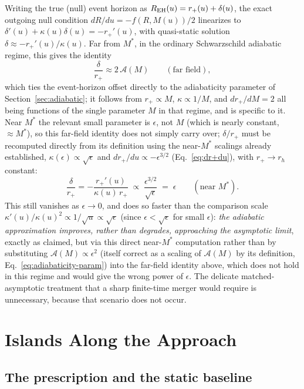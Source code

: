 \documentclass[11pt]{article}
\begin{document}
Writing the true (null) event horizon as $R_{\rm EH}(u)=r_+(u)+\delta(u)$, the exact outgoing null condition $dR/du=-f(R,M(u))/2$ linearizes to $\delta'(u)+\kappa(u)\delta(u)=-r_+'(u)$, with quasi-static solution $\delta\approx-r_+'(u)/\kappa(u)$. Far from $M^*$, in the ordinary Schwarzschild adiabatic regime, this gives the identity
\begin{equation}
\frac{\delta}{r_+}\approx2\,\mathcal{A}(M)\qquad(\text{far field}),
\label{eq:far-field-identity}
\end{equation}
which ties the event-horizon offset directly to the adiabaticity parameter of Section~\ref{sec:adiabatic}; it follows from $r_+\propto M$, $\kappa\propto1/M$, and $dr_+/dM=2$ all being functions of the single parameter $M$ in that regime, and is specific to it. Near $M^*$ the relevant small parameter is $\epsilon$, not $M$ (which is nearly constant, $\approx M^*$), so this far-field identity does not simply carry over; $\delta/r_+$ must be recomputed directly from its definition using the near-$M^*$ scalings already established, $\kappa(\epsilon)\propto\sqrt\epsilon$ and $dr_+/du\propto-\epsilon^{3/2}$ (Eq.~\eqref{eq:dr+du}), with $r_+\to r_h$ constant:
\begin{equation}
\frac{\delta}{r_+}=-\frac{r_+'(u)}{\kappa(u)\,r_+}\;\propto\;\frac{\epsilon^{3/2}}{\sqrt\epsilon}\;=\;\epsilon\qquad(\text{near }M^*).
\end{equation}
This still vanishes as $\epsilon\to0$, and does so faster than the comparison scale $\kappa'(u)/\kappa(u)^2\propto1/\sqrt u\propto\sqrt\epsilon$ (since $\epsilon<\sqrt\epsilon$ for small $\epsilon$): \emph{the adiabatic approximation improves, rather than degrades, approaching the asymptotic limit}, exactly as claimed, but via this direct near-$M^*$ computation rather than by substituting $\mathcal{A}(M)\propto\epsilon^2$ (itself correct as a scaling of $\mathcal{A}(M)$ by its definition, Eq.~\eqref{eq:adiabaticity-param}) into the far-field identity above, which does not hold in this regime and would give the wrong power of $\epsilon$. The delicate matched-asymptotic treatment that a sharp finite-time merger would require is unnecessary, because that scenario does not occur.

\section{Islands Along the Approach}
\label{sec:islands}

\subsection{The prescription and the static baseline}
\end{document}
